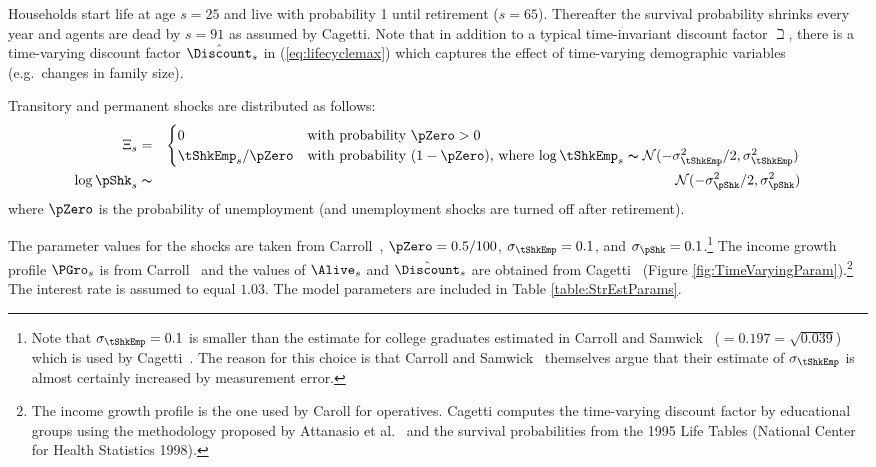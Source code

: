 \documentclass[titlepage]{\econtex}
\begin{document}
  Households start life at age $s=25$ and live with probability 1 until retirement
  ($s=65$). Thereafter the survival probability shrinks every year and
  agents are dead by $s=91$ as assumed by Cagetti. Note that in addition to a typical
  time-invariant discount factor $\beth$, there is a time-varying
  discount factor $\hat{\Discount}_{s}$ in (\ref{eq:lifecyclemax}) which
  captures the effect of time-varying demographic variables (e.g.\ changes in family size).

  Transitory and permanent shocks are distributed as follows:
  \begin{eqnarray}
    \Xi_{s}&=&
               \begin{cases}
                 0\phantom{/\pZero} & \text{with probability $\pZero>0$} \\
                 \tShkEmp_{s}/\pZero      & \text{with probability $(1-\pZero)$, where $\log \tShkEmp_{s}\thicksim \mathcal{N}(-\sigma_{\tShkEmp}^{2}/2,\sigma_{\tShkEmp}^{2})$}\\
               \end{cases}\\
    \log \pShk_{s} &\thicksim& \mathcal{N}(-\sigma_{\pShk}^{2}/2,\sigma_{\pShk}^{2})
  \end{eqnarray}
  where $\pZero$ is the probability of unemployment (and unemployment shocks are turned off after retirement).

  The parameter values for the shocks are taken from Carroll~\citeyearpar{carroll:brookings}, $\pZero=0.5/100$, $\sigma _{\tShkEmp }=0.1$, and $\sigma_{\pShk}=0.1$.\footnote{Note that $\sigma _{\tShkEmp}=0.1$ is smaller than the estimate for college graduates estimated in
    Carroll and Samwick~\citeyearpar{carroll&samwick:nature} ($=0.197=\sqrt{0.039}$) which is used by Cagetti~\citeyearpar{cagettiWprofiles}. The reason for this choice is that Carroll and Samwick~\citeyearpar{carroll&samwick:nature} themselves argue that their estimate of $\sigma_{\tShkEmp }$ is almost certainly increased by measurement error.} The income growth profile $\PGro_{s}$ is from Carroll~\citeyearpar{carrollBSLCPIH} and the values of $\Alive_{s}$ and $\hat{\Discount}_{s}$ are obtained from Cagetti~\citeyearpar{cagettiWprofiles} (Figure \ref{fig:TimeVaryingParam}).\footnote{The income growth profile is the one used by Caroll for operatives. Cagetti computes the time-varying discount factor by educational groups using the methodology proposed by Attanasio et al.~\citeyearpar{AttanasioBanksMeghirWeber} and the survival probabilities from the 1995 Life Tables (National Center for Health Statistics 1998).} The interest rate is assumed to equal $1.03$. The model parameters are included in Table \ref{table:StrEstParams}.
\end{document}
